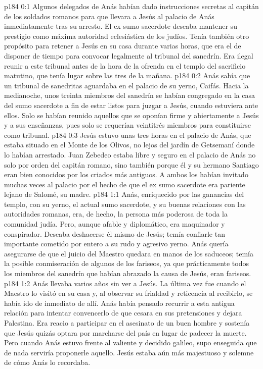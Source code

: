 \author{Comisión de seres intermedios}
\vs p184 0:1 Algunos delegados de Anás habían dado instrucciones secretas al capitán de los soldados romanos para que llevara a Jesús al palacio de Anás inmediatamente tras su arresto. El ex sumo sacerdote deseaba mantener su prestigio como máxima autoridad eclesiástica de los judíos. Tenía también otro propósito para retener a Jesús en su casa durante varias horas, que era el de disponer de tiempo para convocar legalmente al tribunal del sanedrín. Era ilegal reunir a este tribunal antes de la hora de la ofrenda en el templo del sacrificio matutino, que tenía lugar sobre las tres de la mañana.
\vs p184 0:2 Anás sabía que un tribunal de sanedritas aguardaba en el palacio de su yerno, Caifás. Hacia la medianoche, unos treinta miembros del sanedrín se habían congregado en la casa del sumo sacerdote a fin de estar listos para juzgar a Jesús, cuando estuviera ante ellos. Solo se habían reunido aquellos que se oponían firme y abiertamente a Jesús y a sus enseñanzas, pues solo se requerían veintitrés miembros para constituirse como tribunal.
\vs p184 0:3 Jesús estuvo unas tres horas en el palacio de Anás, que estaba situado en el Monte de los Olivos, no lejos del jardín de Getsemaní donde lo habían arrestado. Juan Zebedeo estaba libre y seguro en el palacio de Anás no solo por orden del capitán romano, sino también porque él y su hermano Santiago eran bien conocidos por los criados más antiguos. A ambos los habían invitado muchas veces al palacio por el hecho de que el ex sumo sacerdote era pariente lejano de Salomé, su madre.
\vs p184 1:1 Anás, enriquecido por las ganancias del templo, con su yerno, el actual sumo sacerdote, y su buenas relaciones con las autoridades romanas, era, de hecho, la persona más poderosa de toda la comunidad judía. Pero, aunque afable y diplomático, era maquinador y conspirador. Deseaba deshacerse él mismo de Jesús; temía confiarle tan importante cometido por entero a su rudo y agresivo yerno. Anás quería asegurarse de que el juicio del Maestro quedara en manos de los saduceos; temía la posible conmiseración de algunos de los fariseos, ya que prácticamente todos los miembros del sanedrín que habían abrazado la causa de Jesús, eran fariseos.
\vs p184 1:2 Anás llevaba varios años sin ver a Jesús. La última vez fue cuando el Maestro lo visitó en su casa y, al observar su frialdad y reticencia al recibirlo, se había ido de inmediato de allí. Anás había pensado recurrir a esta antigua relación para intentar convencerlo de que cesara en sus pretensiones y dejara Palestina. Era reacio a participar en el asesinato de un buen hombre y sostenía que Jesús quizás optara por marcharse del país en lugar de padecer la muerte. Pero cuando Anás estuvo frente al valiente y decidido galileo, supo enseguida que de nada serviría proponerle aquello. Jesús estaba aún más majestuoso y solemne de cómo Anás lo recordaba.
